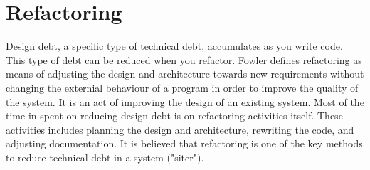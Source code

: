\section{Refactoring}
Design debt, a specific type of technical debt, accumulates as you write code\cite{Zazworka:2011:PDD:1985362.1985372}. This type of debt can be reduced when you refactor. Fowler defines refactoring as means of adjusting the design and architecture towards new requirements without changing the externial behaviour of a program in order to improve the quality of the system\cite{1999:RID:311424}. It is an act of improving the design of an existing system\cite{Vliet:2008:SEP:1481475}. Most of the time in spent on reducing design debt is on refactoring activities itself. These activities includes planning the design and architecture, rewriting the code, and adjusting documentation\cite{Pressman:2009:SEP:1593949}. It is believed that refactoring is one of the key methods to reduce technical debt in a system ("siter").  





